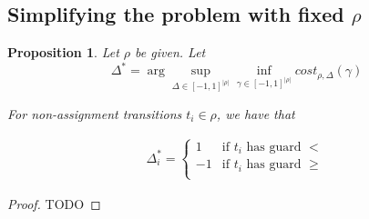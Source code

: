 \documentclass{article}
\newtheorem{proposition}{Proposition}[section]
\newtheorem{definition}{Definition}[section]
\newcommand{\1}{\langle 1 \rangle}
\newcommand{\2}{\langle 2 \rangle}
\begin{document}



\subsection{Simplifying the problem with fixed $\rho$}

\begin{proposition}
    \label{prop:deltas_non_assignment}
    Let $\rho$ be given. Let \[\Delta^* = \arg \sup_{\Delta \in [-1, 1]^{|\rho|}} \inf_{\gamma \in [-1, 1]^{|\rho|}} cost_{\rho, \Delta} (\gamma)\]
    
    For non-assignment transitions $t_i \in \rho$, we have that 

    \begin{align*}
        \Delta_i^* = \begin{cases}
            1 & \text{if } t_i \text{ has guard } < \\
            -1 & \text{if } t_i \text{ has guard } \geq \\
        \end{cases}
    \end{align*}
\end{proposition}

\begin{proof}
    TODO
\end{proof}
\end{document}
